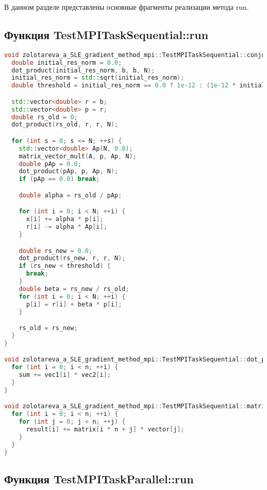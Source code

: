 \documentclass[12pt]{article}
\begin{document}
В данном разделе представлены основные фрагменты реализации метода run.

\clearpage
\subsection*{Функция TestMPITaskSequential::run}

\begin{lstlisting}[language=C++]
void zolotareva_a_SLE_gradient_method_mpi::TestMPITaskSequential::conjugate_gradient(const std::vector<double>& A, const std::vector<double>& b, std::vector<double>& x, int N) {
  double initial_res_norm = 0.0;
  dot_product(initial_res_norm, b, b, N);
  initial_res_norm = std::sqrt(initial_res_norm);
  double threshold = initial_res_norm == 0.0 ? 1e-12 : (1e-12 * initial_res_norm);

  std::vector<double> r = b;
  std::vector<double> p = r;
  double rs_old = 0;
  dot_product(rs_old, r, r, N);

  for (int s = 0; s <= N; ++s) {
    std::vector<double> Ap(N, 0.0);
    matrix_vector_mult(A, p, Ap, N);
    double pAp = 0.0;
    dot_product(pAp, p, Ap, N);
    if (pAp == 0.0) break;

    double alpha = rs_old / pAp;

    for (int i = 0; i < N; ++i) {
      x[i] += alpha * p[i];
      r[i] -= alpha * Ap[i];
    }

    double rs_new = 0.0;
    dot_product(rs_new, r, r, N);
    if (rs_new < threshold) { 
      break;
    }
    double beta = rs_new / rs_old;
    for (int i = 0; i < N; ++i) {
      p[i] = r[i] + beta * p[i];
    }

    rs_old = rs_new;
  }
}

void zolotareva_a_SLE_gradient_method_mpi::TestMPITaskSequential::dot_product(double& sum, const std::vector<double>& vec1, const std::vector<double>& vec2, int n) {
  for (int i = 0; i < n; ++i) {
    sum += vec1[i] * vec2[i];
  }
}

void zolotareva_a_SLE_gradient_method_mpi::TestMPITaskSequential::matrix_vector_mult(const std::vector<double>& matrix, const std::vector<double>& vector, std::vector<double>& result, int n) {
  for (int i = 0; i < n; ++i) {
    for (int j = 0; j < n; ++j) {
      result[i] += matrix[i * n + j] * vector[j];
    }
  }
}
\end{lstlisting}

\subsection*{Функция TestMPITaskParallel::run}
\end{document}

